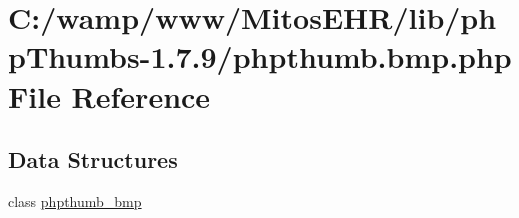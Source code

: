 \hypertarget{phpthumb_8bmp_8php}{\section{\-C\-:/wamp/www/\-Mitos\-E\-H\-R/lib/php\-Thumbs-\/1.7.9/phpthumb.bmp.\-php \-File \-Reference}
\label{phpthumb_8bmp_8php}
}
\subsection*{\-Data \-Structures}
\begin{DoxyCompactItemize}
\item 
class \hyperlink{classphpthumb__bmp}{phpthumb\-\_\-bmp}
\end{DoxyCompactItemize}
